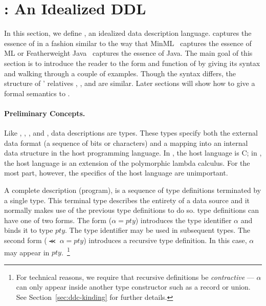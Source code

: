 \section{\ipads{}:  An Idealized DDL}
\label{sec:ipads}

In this section, we define \ipads{}, an idealized data description
language.  \ipads{} captures the essence of \pads{} in a fashion
similar to the way that MinML~\cite{harper:plbook} captures the essence of ML or Featherweight
Java~\cite{igarasi+:featherweight} captures the essence of Java.  The main goal of this section is to introduce
the reader to the form and function of \ipads{} by giving its syntax
and walking through a couple of examples.  Though the syntax differs,
the structure of \pads{}' relatives \blt, \packettypes, and
\datascript{} are similar.  Later sections will show how to give a
formal semantics to \ipads.

\paragraph*{Preliminary Concepts.}
Like \pads, \packettypes, \datascript, and \blt, \ipads{} data
descriptions are types.  These types specify both the external data
format (a sequence of bits or characters) and a mapping into an
internal data structure in the host programming language.  In \pads,
the host language is C; in \ipads, the host language is an extension
of the polymorphic lambda calculus.  For the most part, however, the
specifics of the host language are unimportant.

A complete \ipads{} description (program), is a sequence of type definitions
terminated by a single type.  This terminal type describes the
entirety of a data source and it normally makes use of the previous 
type definitions to do so.  \ipads{} type definitions can have one of
two forms.  The form ($\alpha = pty$) introduces the type identifier
$\alpha$ and binds it to \ipads{} type $pty$.
The type identifier may be used in
subsequent types.  The second form  ($\Prec{}\; \alpha = pty$) introduces
a recursive type definition.  In this case, $\alpha$ may appear in 
$pty$.~\footnote{For technical reasons, 
we require that recursive definitions be {\it contractive} ---
$\alpha$ can only appear inside another type constructor such as a
record or union.  See Section~\ref{sec:ddc-kinding} for further details.}

